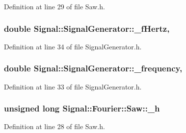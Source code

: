 Definition at line 29 of file Saw.\+h.

\hypertarget{classSignal_1_1SignalGenerator_a85a4702347352bab1c71e0a8df8437d6}{
\subsubsection[{\+\_\+f\+Hertz}]{\setlength{\rightskip}{0pt plus 5cm}double Signal\+::\+Signal\+Generator\+::\+\_\+f\+Hertz\hspace{0.3cm}{\ttfamily [protected]}, {\ttfamily [inherited]}}}\label{classSignal_1_1SignalGenerator_a85a4702347352bab1c71e0a8df8437d6}


Definition at line 34 of file Signal\+Generator.\+h.

\hypertarget{classSignal_1_1SignalGenerator_a7f107461333bce68c5dad412db96a8c2}{
\subsubsection[{\+\_\+frequency}]{\setlength{\rightskip}{0pt plus 5cm}double Signal\+::\+Signal\+Generator\+::\+\_\+frequency\hspace{0.3cm}{\ttfamily [protected]}, {\ttfamily [inherited]}}}\label{classSignal_1_1SignalGenerator_a7f107461333bce68c5dad412db96a8c2}


Definition at line 33 of file Signal\+Generator.\+h.

\hypertarget{classSignal_1_1Fourier_1_1Saw_a7e796347f04f0f4370a472587701b82b}{
\subsubsection[{\+\_\+h}]{\setlength{\rightskip}{0pt plus 5cm}unsigned long Signal\+::\+Fourier\+::\+Saw\+::\+\_\+h\hspace{0.3cm}{\ttfamily [protected]}}}\label{classSignal_1_1Fourier_1_1Saw_a7e796347f04f0f4370a472587701b82b}


Definition at line 28 of file Saw.\+h.

